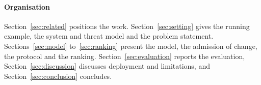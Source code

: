 \paragraph{Organisation} Section~\ref{sec:related} positions the work. Section~\ref{sec:setting} gives the running example, the system and threat model and the problem statement. Sections~\ref{sec:model} to~\ref{sec:ranking} present the model, the admission of change, the protocol and the ranking. Section~\ref{sec:evaluation} reports the evaluation, Section~\ref{sec:discussion} discusses deployment and limitations, and Section~\ref{sec:conclusion} concludes.
